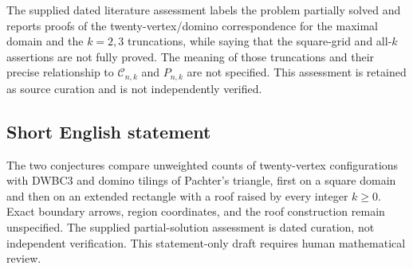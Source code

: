 \documentclass[11pt]{article}
\begin{document}
The supplied dated literature assessment labels the problem partially solved and reports proofs of the twenty-vertex/domino correspondence for the maximal domain and the \(k=2,3\) truncations, while saying that the square-grid and all-\(k\) assertions are not fully proved. The meaning of those truncations and their precise relationship to \(\mathcal C_{n,k}\) and \(P_{n,k}\) are not specified. This assessment is retained as source curation and is not independently verified.
\subsection{Short English statement}
The two conjectures compare unweighted counts of twenty-vertex configurations with DWBC3 and domino tilings of Pachter's triangle, first on a square domain and then on an extended rectangle with a roof raised by every integer \(k\geq0\). Exact boundary arrows, region coordinates, and the roof construction remain unspecified. The supplied partial-solution assessment is dated curation, not independent verification. This statement-only draft requires human mathematical review.
\end{document}

